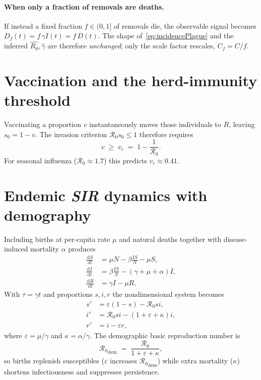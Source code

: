 \documentclass[11pt]{article}
\newcommand{\dd}{\,\mathrm{d}}
\newcommand{\RR}{\mathcal{R}_0}
\begin{document}
\paragraph{When only a fraction of removals are deaths.}
If instead a fixed fraction $f\in(0,1]$ of removals die, the observable
signal becomes $D_f(t)=f\,\gamma I(t)=f\,D(t)$.
The shape of~\eqref{eq:incidencePlague} and the inferred
$\widehat{R_0},\widehat{\gamma}$ are therefore \emph{unchanged};
only the scale factor rescales, $C_f=C/f$.

\section{Vaccination and the herd-immunity threshold}\label{sec:Vaccination}

Vaccinating a proportion $v$ instantaneously moves those individuals to
$R$, leaving $s_0=1-v$.  The invasion criterion $\RR s_0\le1$ therefore
requires
\begin{equation*}
  v \;\ge\; v_c \;=\; 1-\frac{1}{\RR}.
\end{equation*}
For seasonal influenza ($\RR\approx1.7$) this predicts
$v_c\approx0.41$.
\section{Endemic \textit{SIR} dynamics with demography}\label{sec:Endemic}

Including births at per-capita rate $\mu$ and natural deaths together
with disease-induced mortality $\alpha$ produces
\begin{align*}
  \frac{\dd S}{\dd t} &= \mu N - \beta \frac{I S}{N} - \mu S, \\
  \frac{\dd I}{\dd t} &= \beta \frac{I S}{N} - (\gamma+\mu+\alpha)I, \\
  \frac{\dd R}{\dd t} &= \gamma I - \mu R .
\end{align*}
With $\tau=\gamma t$ and proportions
$s,i,r$ the nondimensional system becomes
\begin{align*}
  s' &= \varepsilon(1-s) - \RR s i, \\
  i' &= \RR s i - (1+\varepsilon+\kappa)i, \\
  r' &= i - \varepsilon r,
\end{align*}
where $\varepsilon=\mu/\gamma$ and $\kappa=\alpha/\gamma$.
The demographic basic reproduction number is
\begin{equation}\label{eq:R0dem}
  {\RR}_{\mathrm{dem}}
  \;=\;
  \frac{\RR}{1+\varepsilon+\kappa},
\end{equation}
so births replenish susceptibles ($\varepsilon$ increases
${\RR}_{\mathrm{dem}}$) while extra mortality ($\kappa$) shortens
infectiousness and suppresses persistence.
\end{document}
